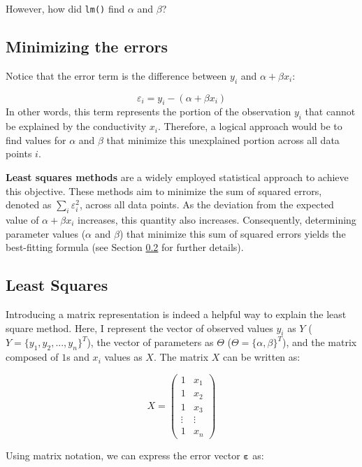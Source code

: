\documentclass[
]{book}
\begin{document}
However, how did \texttt{lm()} find \(\alpha\) and \(\beta\)?

\hypertarget{minimizing-the-errors}{%
\subsection{Minimizing the errors}\label{minimizing-the-errors}}

Notice that the error term is the difference between \(y_i\) and \(\alpha + \beta x_i\):

\[
\varepsilon_i = y_i - (\alpha + \beta x_i)
\]In other words, this term represents the portion of the observation \(y_i\) that cannot be explained by the conductivity \(x_i\). Therefore, a logical approach would be to find values for \(\alpha\) and \(\beta\) that minimize this unexplained portion across all data points \(i\).

\textbf{Least squares methods} are a widely employed statistical approach to achieve this objective. These methods aim to minimize the sum of squared errors, denoted as \(\sum_i \varepsilon_i^2\), across all data points. As the deviation from the expected value of \(\alpha + \beta x_i\) increases, this quantity also increases. Consequently, determining parameter values (\(\alpha\) and \(\beta\)) that minimize this sum of squared errors yields the best-fitting formula (see Section \ref{least-squares} for further details).

\hypertarget{least-squares}{%
\subsection{Least Squares}\label{least-squares}}

Introducing a matrix representation is indeed a helpful way to explain the least square method. Here, I represent the vector of observed values \(y_i\) as \(Y\) (\(Y = \{y_1, y_2,...,y_n\}^T\)), the vector of parameters as \(\Theta\) (\(\Theta = \{\alpha, \beta\}^T\)), and the matrix composed of \(1\)s and \(x_i\) values as \(X\). The matrix \(X\) can be written as:

\[
X =
\begin{pmatrix} 
  1 & x_1\\ 
  1 & x_2\\
  1 & x_3\\
  \vdots & \vdots\\
  1 & x_n
\end{pmatrix}
\]

Using matrix notation, we can express the error vector \(\pmb{\varepsilon}\) as:
\end{document}
